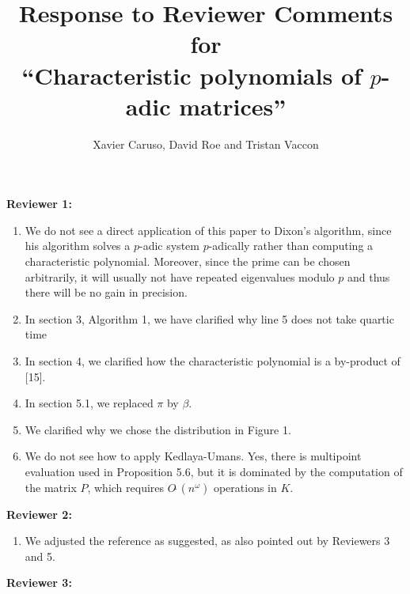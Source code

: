 \documentclass{article}
\title{Response to Reviewer Comments for \\ ``Characteristic polynomials of $p$-adic matrices''}
\author{Xavier Caruso, David Roe and Tristan Vaccon}
\newcommand{\softO}{O\tilde{~}}
\newcommand{\done}[1]{#1}
\begin{document}
\maketitle

\vspace{0.1in}
\noindent \textbf{Reviewer 1:}
\begin{enumerate}
\item \done{We do not see a direct application of this paper to Dixon's algorithm, since his algorithm solves a $p$-adic system $p$-adically rather than computing a characteristic polynomial.  Moreover, since the prime can be chosen arbitrarily, it will usually not have repeated eigenvalues modulo $p$ and thus there will be no gain in precision.}
\item \done{In section 3, Algorithm 1, we have clarified why line 5 does not take quartic time}
\item \done{In section 4, we clarified how the characteristic polynomial is a by-product of [15].}
\item \done{In section 5.1, we replaced $\pi$ by $\beta$.}
\item \done{We clarified why we chose the distribution in Figure 1.}
\item \done{We do not see how to apply Kedlaya-Umans.  Yes, there is multipoint evaluation used in Proposition 5.6, but it is dominated by the computation of the matrix $P$, which requires $\softO(n^\omega)$ operations in $K$.}
\end{enumerate}
\textbf{Reviewer 2:}
\begin{enumerate}
\item \done{We adjusted the reference as suggested, as also pointed out by Reviewers 3 and 5.}
\end{enumerate}
\textbf{Reviewer 3:}
\end{document}
